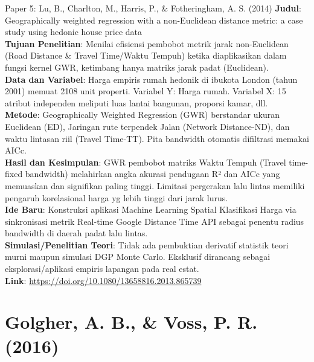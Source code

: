 \documentclass{beamer}
\begin{document}
\begin{frame}[allowframebreaks]{Paper 5: Lu, B., Charlton, M., Harris, P., \& Fotheringham, A. S. (2014)}
    \textbf{Judul}: Geographically weighted regression with a non-Euclidean distance metric: a case study using hedonic house price data \\
    \textbf{Tujuan Penelitian}: Menilai efisiensi pembobot metrik jarak non-Euclidean (Road Distance \& Travel Time/Waktu Tempuh) ketika diaplikasikan dalam fungsi kernel GWR, ketimbang hanya matriks jarak padat (Euclidean). \\
    \vspace{0.3cm}
    \textbf{Data dan Variabel}: Harga empiris rumah hedonik di ibukota London (tahun 2001) memuat 2108 unit properti. Variabel Y: Harga rumah. Variabel X: 15 atribut independen meliputi luas lantai bangunan, proporsi kamar, dll. \\
    \vspace{0.3cm}
    \textbf{Metode}: Geographically Weighted Regression (GWR) berstandar ukuran Euclidean (ED), Jaringan rute terpendek Jalan (Network Distance-ND), dan waktu lintasan riil (Travel Time-TT). Pita bandwidth otomatis difiltrasi memakai AICc. \\
    \framebreak
    \textbf{Hasil dan Kesimpulan}: GWR pembobot matriks Waktu Tempuh (Travel time-fixed bandwidth) melahirkan angka akurasi pendugaan R² dan AICc yang memuaskan dan signifikan paling tinggi. Limitasi pergerakan lalu lintas memiliki pengaruh korelasional harga yg lebih tinggi dari jarak lurus. \\
    \vspace{0.3cm}
    \textbf{Ide Baru}: Konstruksi aplikasi Machine Learning Spatial Klasifikasi Harga via sinkronisasi metrik Real-time Google Distance Time API sebagai penentu radius bandwidth di daerah padat lalu lintas. \\
    \vspace{0.3cm}
    \textbf{Simulasi/Penelitian Teori}: Tidak ada pembuktian derivatif statistik teori murni maupun simulasi DGP Monte Carlo. Eksklusif dirancang sebagai eksplorasi/aplikasi empiris lapangan pada real estat. \\
    \vspace{0.3cm}
    \textbf{Link}: \url{https://doi.org/10.1080/13658816.2013.865739}
\end{frame}

\section{Golgher, A. B., \& Voss, P. R. (2016)}
\end{document}
